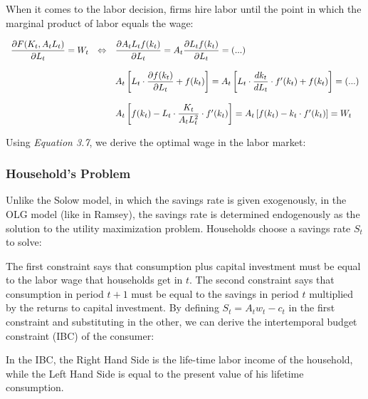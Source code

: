 When it comes to the labor decision, firms hire labor until the point in which the marginal product of labor equals the wage:

$$
\begin{array}{llllllll}
\dfrac{\partial F(K_t,A_tL_t)}{\partial L_t}=W_t & \Leftrightarrow & \dfrac{\partial A_tL_tf(k_t)}{\partial L_t}= A_t \dfrac{\partial L_tf(k_t)}{\partial L_t} = (...)\\
\\
& & A_t \left[ L_t \cdot \dfrac{\partial f(k_t)}{\partial L_t} + f(k_t) \right] = A_t\left[ L_t \cdot \dfrac{dk_t}{dL_t} \cdot f'(k_t) + f(k_t)\right] = (...)\\
\\
& & A_t\left[f(k_t) - L_t \cdot \dfrac{K_t}{A_tL_t^2} \cdot f'(k_t) \right] = A_t\left[f(k_t) - k_t \cdot f'(k_t) \right] =W_t
\end{array}
$$

\bigskip
Using \textit{Equation 3.7}, we derive the optimal wage in the labor market:

\subsubsection{Household's Problem}

Unlike the Solow model, in which the savings rate is given exogenously, in the OLG model (like in Ramsey), the savings rate is determined endogenously as the solution to the utility maximization problem. Households choose a savings rate $S_t$ to solve:

The first constraint says that consumption plus capital investment must be equal to the labor wage that households get in $t$. The second constraint says that consumption in period $t+1$ must be equal to the savings in period $t$ multiplied by the returns to capital investment. By defining $S_t=A_tw_t-c_t$ in the first constraint and substituting in the other, we can derive the intertemporal budget constraint (IBC) of the consumer:

\bigskip
In the IBC, the Right Hand Side is the life-time labor income of the household, while the Left Hand Side is equal to the present value of his lifetime consumption. \\

